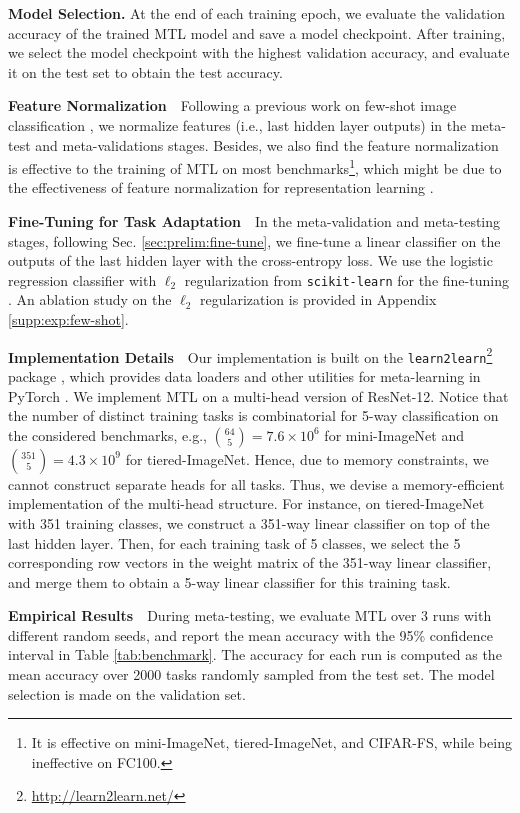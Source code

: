 \documentclass{article}
\begin{document}
\textbf{Model Selection.} At the end of each training epoch, we evaluate the validation accuracy of the trained MTL model and save a model checkpoint. After training, we select the model checkpoint with the highest validation accuracy, and evaluate it on the test set to obtain the test accuracy.

\textbf{Feature Normalization}~~Following a previous work on few-shot image classification \cite{tian2020rethink}, we normalize features (i.e., last hidden layer outputs) in the meta-test and meta-validations stages. Besides, we also find the feature normalization is effective to the training of MTL on most benchmarks\footnote{It is effective on mini-ImageNet, tiered-ImageNet, and CIFAR-FS, while being ineffective on FC100.}, which might be due to the effectiveness of feature normalization for representation learning \citep{wang2020understand}.

\textbf{Fine-Tuning for Task Adaptation}~~In the meta-validation and meta-testing stages, following Sec. \ref{sec:prelim:fine-tune}, we fine-tune a linear classifier on the outputs of the last hidden layer with the cross-entropy loss. We use the logistic regression classifier with $\ell_2$ regularization from \texttt{scikit-learn} for the fine-tuning \citep{sklearn}. An ablation study on the $\ell_2$ regularization is provided in Appendix \ref{supp:exp:few-shot}.



\textbf{Implementation Details}~~Our implementation is built on the \texttt{learn2learn}\footnote{ \url{http://learn2learn.net/}} package \cite{learn2learn2019}, which provides data loaders and other utilities for meta-learning in PyTorch \cite{pytorch}. We implement MTL on a multi-head version of ResNet-12. Notice that the number of distinct training tasks is combinatorial for 5-way classification on the considered benchmarks, e.g., $\binom{64}{5}=7.6\times 10^{6}$ for mini-ImageNet and $\binom{351}{5}=4.3\times 10^{9}$ for tiered-ImageNet. Hence, due to memory constraints, we cannot construct separate heads for all tasks. Thus, we devise a memory-efficient implementation of the multi-head structure. For instance, on tiered-ImageNet with  351 training classes, we construct a 351-way linear classifier on top of the last hidden layer. Then, for each training task of 5 classes, we select the 5 corresponding row vectors in the weight matrix of the 351-way linear classifier, and merge them to obtain a 5-way linear classifier for this training task.

\textbf{Empirical Results}~~During meta-testing, we evaluate MTL over 3 runs with different random seeds, and report the mean accuracy with the 95\% confidence interval in Table \ref{tab:benchmark}. The accuracy for each run is computed as the mean accuracy over 2000 tasks randomly sampled from the test set. The model selection is made on the validation set.
\end{document}
